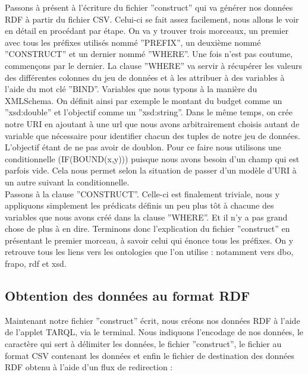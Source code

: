 \documentclass[a4paper,sffamily,12pt]{article}
\begin{document}
			Passons à présent à l'écriture du fichier ''construct'' qui va générer nos données RDF à partir du fichier CSV. Celui-ci se fait assez facilement, nous allons le voir en détail en procédant par étape. On va y trouver trois morceaux, un premier avec tous les préfixes utilisés nommé ''PREFIX'', un deuxième nommé ''CONSTRUCT'' et un dernier nommé ''WHERE''. Une fois n'est pas coutume, commençons par le dernier. La clause ''WHERE'' va servir à récupérer les valeurs des différentes colonnes du jeu de données et à les attribuer à des variables à l'aide du mot clé ''BIND''. Variables que nous typons à la manière du XMLSchema. On définit ainsi par exemple le montant du budget comme un ''xsd:double'' et l'objectif comme un ''xsd:string''. Dans le même temps, on crée notre URI en ajoutant à une url que nous avons arbitrairement choisis autant de variable que nécessaire pour identifier chacun des tuples de notre jeu de données. L'objectif étant de ne pas avoir de doublon. Pour ce faire nous utilisons une conditionnelle (IF(BOUND(x,y))) puisque nous avons besoin d'un champ qui est parfois vide. Cela nous permet selon la situation de passer d'un modèle d'URI à un autre suivant la conditionnelle. \\
			
			\indent Passons à la clause ''CONSTRUCT''. Celle-ci est finalement triviale,  nous y appliquons simplement les prédicats définis un peu plus tôt à chacune des variables que nous avons créé dans la clause ''WHERE''.  Et il n'y a pas grand chose de plus à en dire. Terminons donc l'explication du fichier ''construct'' en présentant le premier morceau, à savoir celui qui énonce tous les préfixes. On y retrouve tous les liens vers les ontologies que l'on utilise : notamment vers dbo, frapo, rdf et xsd. \\
			
			\vspace{0.5cm}
			
		\subsection{Obtention des données au format RDF}
			
			\vspace{0.5cm}
	
			Maintenant notre fichier ''construct'' écrit, nous créons nos données RDF à l'aide de l'applet TARQL, via le terminal. Nous indiquons l'encodage de nos données, le caractère qui sert à délimiter les données, le fichier ''construct'', le fichier au format CSV contenant les données et enfin le fichier de destination des données RDF obtenu à l'aide d'un flux de redirection : \\
			
\end{document}
